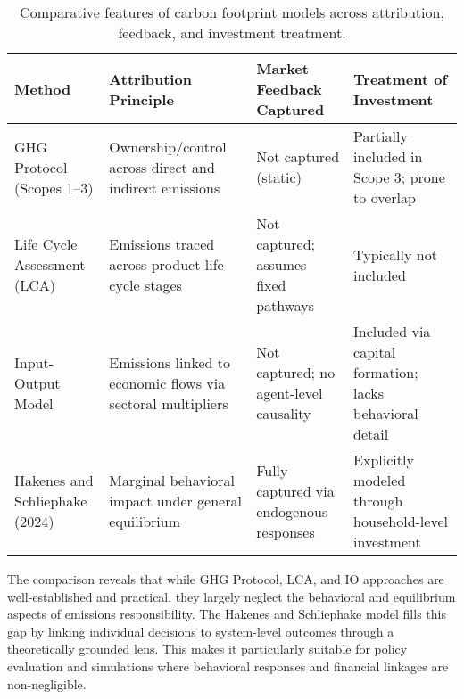 \documentclass[12pt,a4paper]{article}
\begin{document}
\begin{table}[ht]
\centering
\small
\begin{tabular}{|p{4cm}|p{3cm}|p{3.2cm}|p{3cm}|}
\hline
\textbf{Method} & \textbf{Attribution Principle} & \textbf{Market Feedback Captured} & \textbf{Treatment of Investment} \\
\hline
GHG Protocol (Scopes 1–3) & Ownership/control across direct and indirect emissions & Not captured (static) & Partially included in Scope 3; prone to overlap \\
\hline
Life Cycle Assessment (LCA) & Emissions traced across product life cycle stages & Not captured; assumes fixed pathways & Typically not included \\
\hline
Input-Output Model & Emissions linked to economic flows via sectoral multipliers & Not captured; no agent-level causality & Included via capital formation; lacks behavioral detail \\
\hline
Hakenes and Schliephake (2024) & Marginal behavioral impact under general equilibrium & Fully captured via endogenous responses & Explicitly modeled through household-level investment \\
\hline
\end{tabular}
\caption{Comparative features of carbon footprint models across attribution, feedback, and investment treatment.}
\end{table}

The comparison reveals that while GHG Protocol, LCA, and IO approaches are well-established and practical, they largely neglect the behavioral and equilibrium aspects of emissions responsibility. The Hakenes and Schliephake model fills this gap by linking individual decisions to system-level outcomes through a theoretically grounded lens. This makes it particularly suitable for policy evaluation and simulations where behavioral responses and financial linkages are non-negligible.
\end{document}
